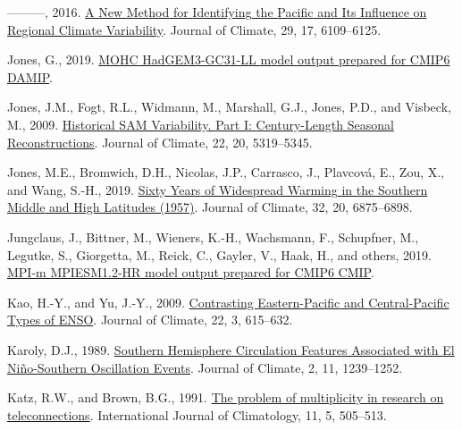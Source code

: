 \documentclass[12pt,oneside]{reedthesis}
\newlength{\cslhangindent}
\newenvironment{CSLReferences}[2] %
 {%
  \setlength{\parindent}{0pt}
  \ifodd #1 \everypar{\setlength{\hangindent}{\cslhangindent}}\ignorespaces\fi
  \ifnum #2 > 0
  \setlength{\parskip}{#2\baselineskip}
  \fi
 }%
 {}
\begin{document}
\begin{CSLReferences}{1}{0}
\leavevmode{}%
---------, 2016. \href{https://doi.org/10.1175/JCLI-D-15-0843.1}{A {New Method} for {Identifying} the {Pacific} and {Its Influence} on {Regional Climate Variability}}. Journal of Climate, 29, 17, 6109--6125.

\leavevmode{}%
Jones, G., 2019. \href{https://doi.org/10.22033/ESGF/CMIP6.471}{MOHC HadGEM3-GC31-LL model output prepared for CMIP6 DAMIP}.

\leavevmode{}%
Jones, J.M., Fogt, R.L., Widmann, M., Marshall, G.J., Jones, P.D., and Visbeck, M., 2009. \href{https://doi.org/10.1175/2009JCLI2785.1}{Historical {SAM Variability}. {Part I}: {Century-Length Seasonal Reconstructions}}. Journal of Climate, 22, 20, 5319--5345.

\leavevmode{}%
Jones, M.E., Bromwich, D.H., Nicolas, J.P., Carrasco, J., Plavcová, E., Zou, X., and Wang, S.-H., 2019. \href{https://doi.org/10.1175/JCLI-D-18-0565.1}{Sixty {Years} of {Widespread Warming} in the {Southern Middle} and {High Latitudes} (1957)}. Journal of Climate, 32, 20, 6875--6898.

\leavevmode{}%
Jungclaus, J., Bittner, M., Wieners, K.-H., Wachsmann, F., Schupfner, M., Legutke, S., Giorgetta, M., Reick, C., Gayler, V., Haak, H., and others, 2019. \href{https://doi.org/10.22033/ESGF/CMIP6.741}{MPI-m MPIESM1.2-HR model output prepared for CMIP6 CMIP}.

\leavevmode{}%
Kao, H.-Y., and Yu, J.-Y., 2009. \href{https://doi.org/10.1175/2008JCLI2309.1}{Contrasting {Eastern-Pacific} and {Central-Pacific Types} of {ENSO}}. Journal of Climate, 22, 3, 615--632.

\leavevmode{}%
Karoly, D.J., 1989. \href{https://doi.org/10.1175/1520-0442(1989)002\%3C1239:SHCFAW\%3E2.0.CO;2}{Southern {Hemisphere Circulation Features Associated} with {El Niño-Southern Oscillation Events}}. Journal of Climate, 2, 11, 1239--1252.

\leavevmode{}%
Katz, R.W., and Brown, B.G., 1991. \href{https://doi.org/10.1002/joc.3370110504}{The problem of multiplicity in research on teleconnections}. International Journal of Climatology, 11, 5, 505--513.


\end{CSLReferences}
\end{document}
